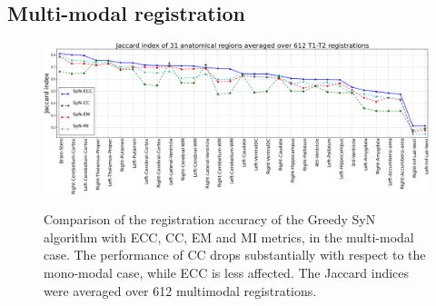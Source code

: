 \subsection{Multi-modal registration}\label{sec:multimodal_results}
\begin{figure}[t!]
\centering
\includegraphics[width=0.95\linewidth]{images/multi_lines_seg.png}\\
\caption{{\small Comparison of the registration accuracy of the Greedy SyN algorithm with ECC, CC, EM and MI metrics, in the multi-modal case. The performance of CC drops substantially with respect to the mono-modal case, while ECC is less affected. The Jaccard indices were averaged over 612 multimodal registrations.}}
\label{fig:multi_seg}\figcloser
\end{figure}
